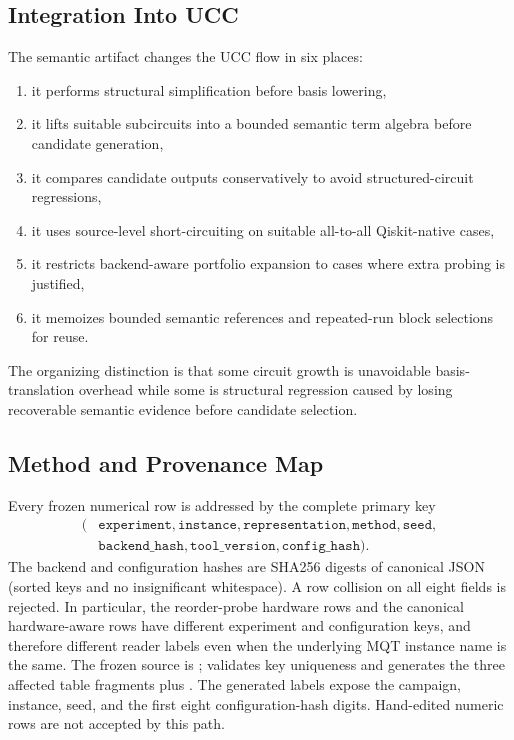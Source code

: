 \subsection{Integration Into UCC}
\label{sec:integration}

The semantic artifact changes the UCC flow in six places:
\begin{enumerate}[leftmargin=1.5em]
    \item it performs structural simplification before basis lowering,
    \item it lifts suitable subcircuits into a bounded semantic term algebra before candidate generation,
    \item it compares candidate outputs conservatively to avoid structured-circuit regressions,
    \item it uses source-level short-circuiting on suitable all-to-all Qiskit-native cases,
    \item it restricts backend-aware portfolio expansion to cases where extra probing is justified,
    \item it memoizes bounded semantic references and repeated-run block selections for reuse.
\end{enumerate}

The organizing distinction is that some circuit growth is unavoidable
basis-translation overhead while some is structural regression caused by
losing recoverable semantic evidence before candidate selection.

\subsection{Method and Provenance Map}
\label{app:method-provenance}

Every frozen numerical row is addressed by the complete primary key
\begin{equation*}
\begin{split}
(&\texttt{experiment},\texttt{instance},\texttt{representation},
  \texttt{method},\texttt{seed},\\
 &\texttt{backend\_hash},\texttt{tool\_version},\texttt{config\_hash}).
\end{split}
\end{equation*}
The backend and configuration hashes are SHA256 digests of canonical JSON
(sorted keys and no insignificant whitespace).  A row collision on all eight
fields is rejected.  In particular, the reorder-probe hardware rows and the
canonical hardware-aware rows have different experiment and configuration
keys, and therefore different reader labels even when the underlying MQT
instance name is the same.  The frozen source is
;
 validates key uniqueness and generates
the three affected table fragments plus
.  The generated labels expose the campaign,
instance, seed, and the first eight configuration-hash digits.  Hand-edited
numeric rows are not accepted by this path.

